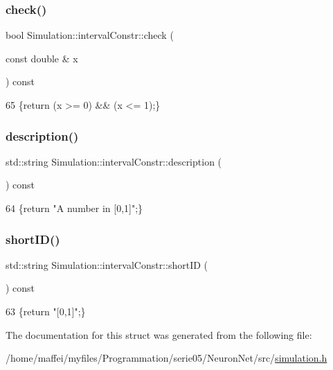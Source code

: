\subsubsection{\texorpdfstring{check()}{check()}}
{\footnotesize\ttfamily bool Simulation\+::interval\+Constr\+::check (\begin{DoxyParamCaption}\item[{const double \&}]{x }\end{DoxyParamCaption}) const\hspace{0.3cm}{\ttfamily [inline]}}


\begin{DoxyCode}
65 \{\textcolor{keywordflow}{return} (x >= 0) && (x <= 1);\}
\end{DoxyCode}
\mbox{\label{structSimulation_1_1intervalConstr_acd0d4140e524a5017441f3d10ca9d3bf}} 
\subsubsection{\texorpdfstring{description()}{description()}}
{\footnotesize\ttfamily std\+::string Simulation\+::interval\+Constr\+::description (\begin{DoxyParamCaption}{ }\end{DoxyParamCaption}) const\hspace{0.3cm}{\ttfamily [inline]}}


\begin{DoxyCode}
64 \{\textcolor{keywordflow}{return} \textcolor{stringliteral}{"A number in [0,1]"};\}
\end{DoxyCode}
\mbox{\label{structSimulation_1_1intervalConstr_a100c7d32a4c1e571e15bbc7463fee2b2}} 
\subsubsection{\texorpdfstring{short\+I\+D()}{shortID()}}
{\footnotesize\ttfamily std\+::string Simulation\+::interval\+Constr\+::short\+ID (\begin{DoxyParamCaption}{ }\end{DoxyParamCaption}) const\hspace{0.3cm}{\ttfamily [inline]}}


\begin{DoxyCode}
63 \{\textcolor{keywordflow}{return} \textcolor{stringliteral}{"[0,1]"};\}
\end{DoxyCode}


The documentation for this struct was generated from the following file\+:\begin{DoxyCompactItemize}
\item 
/home/maffei/myfiles/\+Programmation/serie05/\+Neuron\+Net/src/\hyperlink{simulation_8h}{simulation.\+h}\end{DoxyCompactItemize}
